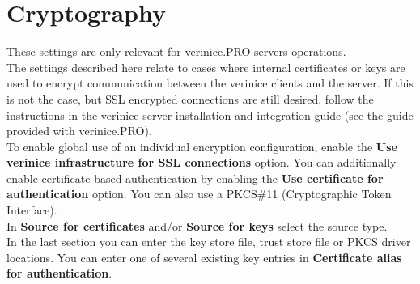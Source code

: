 \documentclass[a4paper,10pt]{book}
\begin{document}
\section{Cryptography}
These settings are only relevant for verinice.\textsc{PRO} servers operations.
\newline\\
The settings described here relate to cases where internal certificates or keys are used to encrypt
communication between the verinice clients and the server. If this is not the case, but SSL encrypted
connections are still desired, follow the instructions in the verinice server installation and integration guide
(see the guide provided with verinice.\textsc{PRO}).
\newline\\
To enable global use of an individual encryption configuration, enable the
\textbf{Use verinice infrastructure for SSL connections} option.
You can additionally enable certificate-based authentication by enabling the
\textbf{Use certificate for authentication} option. You can also use a PKCS\#11 (Cryptographic Token Interface).
\newline\\
In \textbf{Source for certificates} and/or \textbf{Source for keys} select the source type.
\newline\\
In the last section you can enter the key store file, trust store file or PKCS driver locations.
You can enter one of several existing key entries in \textbf{Certificate alias for authentication}.
\end{document}
